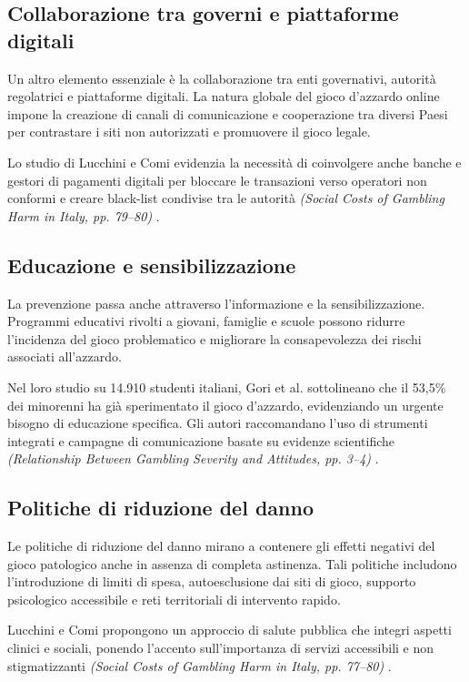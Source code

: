 \documentclass[a4paper,12pt]{article}
\begin{document}
\subsection{Collaborazione tra governi e piattaforme digitali}

Un altro elemento essenziale è la collaborazione tra enti governativi, autorità regolatrici e piattaforme digitali. La natura globale del gioco d’azzardo online impone la creazione di canali di comunicazione e cooperazione tra diversi Paesi per contrastare i siti non autorizzati e promuovere il gioco legale.

Lo studio di Lucchini e Comi evidenzia la necessità di coinvolgere anche banche e gestori di pagamenti digitali per bloccare le transazioni verso operatori non conformi e creare black-list condivise tra le autorità \textit{(Social Costs of Gambling Harm in Italy, pp. 79--80)} \cite{lucchini2022socialcosts}.

\subsection{Educazione e sensibilizzazione}

La prevenzione passa anche attraverso l’informazione e la sensibilizzazione. Programmi educativi rivolti a giovani, famiglie e scuole possono ridurre l’incidenza del gioco problematico e migliorare la consapevolezza dei rischi associati all’azzardo.

Nel loro studio su 14.910 studenti italiani, Gori et al. sottolineano che il 53,5\% dei minorenni ha già sperimentato il gioco d’azzardo, evidenziando un urgente bisogno di educazione specifica. Gli autori raccomandano l’uso di strumenti integrati e campagne di comunicazione basate su evidenze scientifiche \textit{(Relationship Between Gambling Severity and Attitudes, pp. 3--4)} \cite{gori2014adolescentgambling}.

\subsection{Politiche di riduzione del danno}

Le politiche di riduzione del danno mirano a contenere gli effetti negativi del gioco patologico anche in assenza di completa astinenza. Tali politiche includono l’introduzione di limiti di spesa, autoesclusione dai siti di gioco, supporto psicologico accessibile e reti territoriali di intervento rapido.

Lucchini e Comi propongono un approccio di salute pubblica che integri aspetti clinici e sociali, ponendo l’accento sull'importanza di servizi accessibili e non stigmatizzanti \textit{(Social Costs of Gambling Harm in Italy, pp. 77--80)} \cite{lucchini2022socialcosts}.
\end{document}
